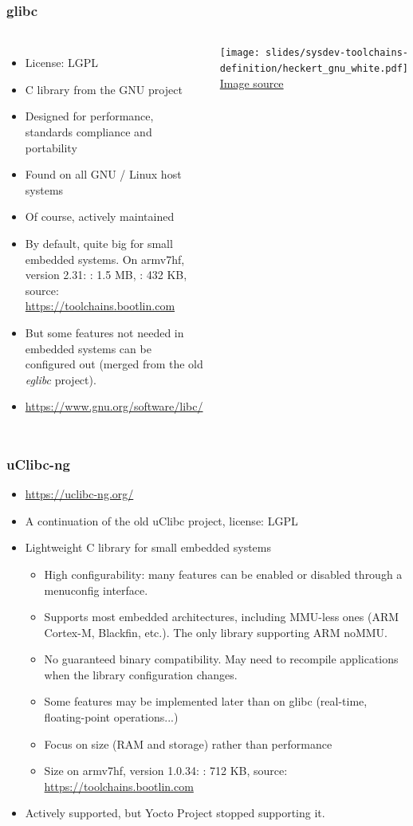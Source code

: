 \begin{frame}
  \frametitle{glibc}
  \begin{columns}
    \begin{itemize}
    \item License: LGPL
    \item C library from the GNU project
    \item Designed for performance, standards compliance and portability
    \item Found on all GNU / Linux host systems
    \item Of course, actively maintained
    \item By default, quite big for small embedded systems.
      On armv7hf, version 2.31: : 1.5 MB, : 432
      KB, source: \url{https://toolchains.bootlin.com}
    \item But some features not needed in embedded systems can be
          configured out (merged from the old {\em eglibc} project).
    \item \url{https://www.gnu.org/software/libc/}
    \end{itemize}
    \vfill
    \minipage[c][0.8\textheight][s]{\columnwidth}
    \texttt{[image: slides/sysdev-toolchains-definition/heckert\_gnu\_white.pdf]}
    \vfill
    \tiny \href{https://en.wikipedia.org/wiki/File:Heckert_GNU_white.svg}{Image source}
    \endminipage
  \end{columns}
\end{frame}

\begin{frame}
  \frametitle{uClibc-ng}
  \begin{itemize}
  \item \url{https://uclibc-ng.org/}
  \item A continuation of the old uClibc project, license: LGPL
  \item Lightweight C library for small embedded systems
    \begin{itemize}
    \item High configurability: many features can be enabled or
      disabled through a menuconfig interface.
    \item Supports most embedded architectures, including MMU-less
          ones (ARM Cortex-M, Blackfin, etc.). The only library
          supporting ARM noMMU.
    \item No guaranteed binary compatibility. May need to
      recompile applications when the library configuration changes.
    \item Some features may be implemented later than on glibc (real-time,
          floating-point operations...)
    \item Focus on size (RAM and storage) rather than performance
    \item Size on armv7hf, version 1.0.34:
      : 712 KB, source: \url{https://toolchains.bootlin.com}
    \end{itemize}
    \item Actively supported, but Yocto Project stopped supporting it.
  \end{itemize}
\end{frame}

